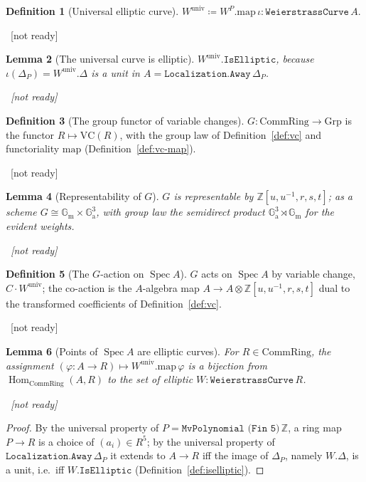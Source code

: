 \documentclass[11pt]{article}
\newcommand{\lean}[1]{\par\smallskip\noindent{\footnotesize\texttt{Lean:\ #1}}\par}
\newcommand{\uses}[1]{}
\newcommand{\notready}{{\footnotesize\textcolor{red!60!black}{\ [not ready]}}}
\theoremstyle{definition}
\newtheorem{definition}{Definition}[section]
\theoremstyle{plain}
\newtheorem{lemma}[definition]{Lemma}
\theoremstyle{remark}
\newcommand{\CRing}{\mathrm{CommRing}}
\newcommand{\Spec}{\operatorname{Spec}}
\newcommand{\VC}{\mathrm{VC}}
\newcommand{\Gm}{\mathbb{G}_{\mathrm m}}
\newcommand{\Ga}{\mathbb{G}_{\mathrm a}}
\newcommand{\Hom}{\operatorname{Hom}}
\newcommand{\map}{\mathrm{map}}
\newcommand{\isEll}{\mathtt{IsElliptic}}
\begin{document}
\begin{definition}[Universal elliptic curve]\label{def:univ}
$W^{\mathrm{univ}}\coloneqq W^{P}.\map\,\iota:\texttt{WeierstrassCurve}\,A$.
\lean{}\notready
\uses{def:univ-ring-A,def:univ-curve-P,def:weier}
\end{definition}

\begin{lemma}[The universal curve is elliptic]\label{lem:univ-elliptic}
$W^{\mathrm{univ}}.\isEll$, because
$\iota(\Delta_P)=W^{\mathrm{univ}}.\Delta$ is a unit in
$A=\texttt{Localization.Away}\,\Delta_P$.
\lean{}\notready
\uses{def:univ,def:iselliptic,lem:iselliptic-map}
\end{lemma}

\begin{definition}[The group functor of variable changes]\label{def:G}
$G\colon\CRing\to\mathrm{Grp}$ is the functor $R\mapsto\VC(R)$, with the group law
of Definition~\ref{def:vc} and functoriality $\map$ (Definition~\ref{def:vc-map}).
\lean{}\notready
\uses{def:vc,def:vc-map}
\end{definition}

\begin{lemma}[Representability of $G$]\label{lem:G-representable}
$G$ is representable by $\mathbb Z[u,u^{-1},r,s,t]$; as a scheme
$G\cong\Gm\times\Ga^3$, with group law the semidirect product $\Ga^3\rtimes\Gm$
for the evident weights.
\lean{}\notready
\uses{def:G,def:vc}
\end{lemma}

\begin{definition}[The $G$-action on $\Spec A$]\label{def:G-action}
$G$ acts on $\Spec A$ by variable change, $C\cdot W^{\mathrm{univ}}$; the co-action
is the $A$-algebra map $A\to A\otimes\mathbb Z[u,u^{-1},r,s,t]$ dual to the
transformed coefficients of Definition~\ref{def:vc}.
\lean{}\notready
\uses{def:G,def:univ,def:vc}
\end{definition}

\begin{lemma}[Points of $\Spec A$ are elliptic curves]\label{lem:Apoint-elliptic}
For $R\in\CRing$, the assignment $(\varphi:A\to R)\mapsto W^{\mathrm{univ}}.\map\,\varphi$
is a bijection from $\Hom_{\CRing}(A,R)$ to the set of elliptic
$W:\texttt{WeierstrassCurve}\,R$.
\lean{}\notready
\uses{def:univ,def:univ-ring-A,def:iselliptic}
\end{lemma}
\begin{proof}
By the universal property of $P=\texttt{MvPolynomial (Fin 5)}\,\mathbb Z$, a ring
map $P\to R$ is a choice of $(a_i)\in R^5$; by the universal property of
$\texttt{Localization.Away}\,\Delta_P$ it extends to $A\to R$ iff the image of
$\Delta_P$, namely $W.\Delta$, is a unit, i.e.\ iff $W.\isEll$
(Definition~\ref{def:iselliptic}).
\end{proof}
\end{document}
